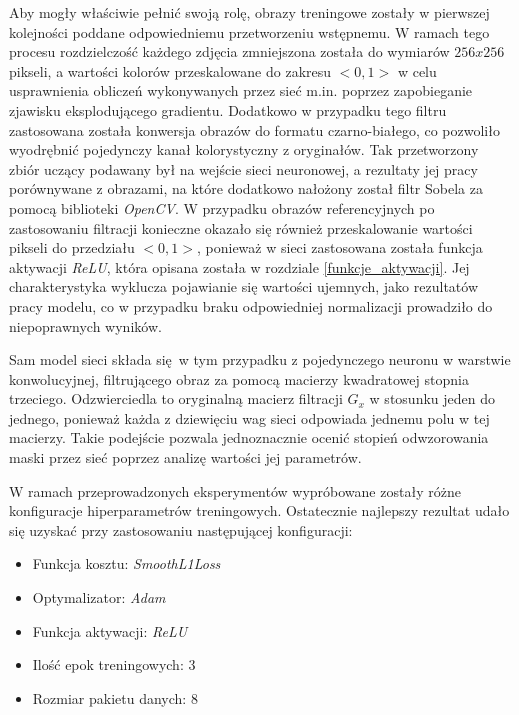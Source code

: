     Aby mogły właściwie pełnić swoją rolę, obrazy treningowe zostały w pierwszej kolejności
    poddane odpowiedniemu przetworzeniu wstępnemu. W ramach tego procesu rozdzielczość
    każdego zdjęcia zmniejszona została do wymiarów $256x256$ pikseli, a wartości kolorów przeskalowane
    do zakresu $<0, 1>$ w celu usprawnienia obliczeń wykonywanych przez sieć m.in.
    poprzez zapobieganie zjawisku eksplodującego gradientu. Dodatkowo w przypadku tego
    filtru zastosowana została konwersja obrazów do formatu czarno-białego, co pozwoliło
    wyodrębnić pojedynczy kanał kolorystyczny z oryginałów. Tak przetworzony zbiór uczący
    podawany był na wejście sieci neuronowej, a rezultaty jej pracy porównywane
    z obrazami, na które dodatkowo nałożony został filtr Sobela za pomocą biblioteki
    \textit{OpenCV}. W przypadku obrazów referencyjnych po zastosowaniu filtracji
    konieczne okazało się również przeskalowanie wartości pikseli do przedziału
    $<0, 1>$, ponieważ w sieci zastosowana została funkcja aktywacji \textit{ReLU}, która
    opisana została w rozdziale \ref{funkcje_aktywacji}. Jej charakterystyka
    wyklucza pojawianie się wartości ujemnych, jako rezultatów pracy modelu, co
    w przypadku braku odpowiedniej normalizacji prowadziło do niepoprawnych wyników.

    Sam model sieci składa się w tym przypadku z pojedynczego neuronu w warstwie
    konwolucyjnej, filtrującego obraz za pomocą macierzy kwadratowej stopnia
    trzeciego. Odzwierciedla to oryginalną macierz filtracji $G_x$ w stosunku jeden
    do jednego, ponieważ każda z dziewięciu wag sieci odpowiada jednemu polu w tej
    macierzy. Takie podejście pozwala jednoznacznie ocenić stopień odwzorowania
    maski przez sieć poprzez analizę wartości jej parametrów.

    W ramach przeprowadzonych eksperymentów wypróbowane zostały różne konfiguracje
    hiperparametrów treningowych. Ostatecznie najlepszy rezultat udało się uzyskać
    przy zastosowaniu następującej konfiguracji:

    \begin{itemize}
    \item Funkcja kosztu: \textit{SmoothL1Loss}
    \item Optymalizator: \textit{Adam}
    \item Funkcja aktywacji: \textit{ReLU}
    \item Ilość epok treningowych: 3
    \item Rozmiar pakietu danych: 8
    \end{itemize}

